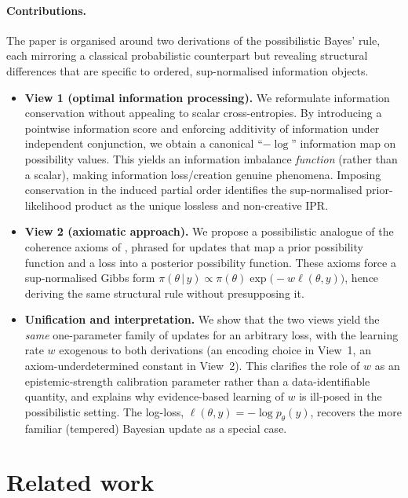 \documentclass[accepted]{uai2026} %
\def\given{\,|\,}
\theoremstyle{remark}
\begin{document}
\paragraph{Contributions.}
The paper is organised around two derivations of the possibilistic Bayes' rule, each mirroring a classical probabilistic counterpart but revealing structural differences that are specific to ordered, sup-normalised information objects.
\begin{itemize}
\item \textbf{View 1 (optimal information processing).} We reformulate information conservation without appealing to scalar cross-entropies. By introducing a pointwise information score and enforcing additivity of information under independent conjunction, we obtain a canonical ``$-\log$'' information map on possibility values. This yields an information imbalance \emph{function} (rather than a scalar), making information loss/creation genuine phenomena. Imposing conservation in the induced partial order identifies the sup-normalised prior-likelihood product as the unique lossless and non-creative IPR.
%
\item \textbf{View 2 (axiomatic approach).} We propose a possibilistic analogue of the coherence axioms of \citet{bissiri2016general}, phrased for updates that map a prior possibility function and a loss into a posterior possibility function. These axioms force a sup-normalised Gibbs form $\pi(\theta\given y) \propto \pi(\theta)\exp\big(-w\ell(\theta, y)\big)$, hence deriving the same structural rule without presupposing it.

\item \textbf{Unification and interpretation.} We show that the two views yield the \emph{same} one-parameter family of updates for an arbitrary loss, with the learning rate $w$ exogenous to both derivations (an encoding choice in View~1, an
axiom-underdetermined constant in View~2). This clarifies the role of $w$ as an epistemic-strength calibration parameter rather than a data-identifiable quantity, and explains why evidence-based learning of $w$ is ill-posed in the possibilistic setting. The log-loss, $\ell(\theta,y)=-\log p_\theta(y)$, recovers the more familiar (tempered) Bayesian update as a special case.
\end{itemize}

\section{Related work}
\end{document}
